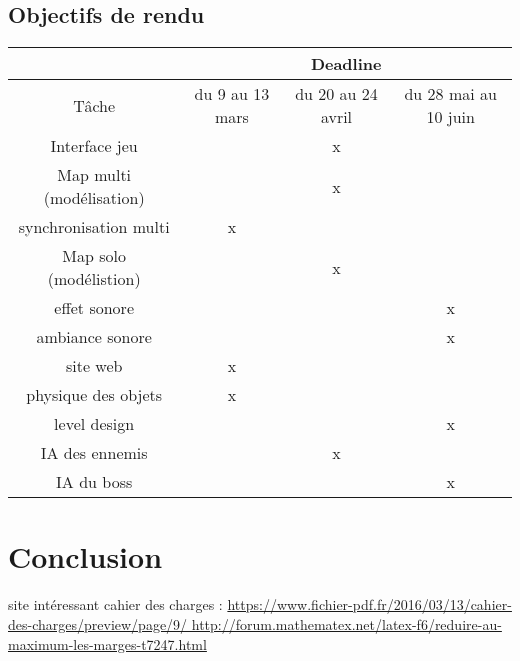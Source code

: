 \documentclass[12pt]{report}
\begin{document}
	\section{Objectifs de rendu}
	
	\begin{tabular}{|*{4}{c|}}
	\hline
	& \multicolumn{3}{|c|}{Deadline}\\
	\hline
	Tâche & du 9 au 13 mars & du 20 au 24 avril & du 28 mai au 10 juin \\
	\hline
	Interface jeu & & x & \\
	\hline
	Map multi (modélisation) & & x & \\
	\hline
	synchronisation multi & x & & \\
	\hline
	Map solo (modélistion) & & x & \\
	\hline
	effet sonore & & & x \\
	\hline
	ambiance sonore & & & x \\
	\hline
	site web & x & & \\
	\hline 
	physique des objets & x & & \\
	\hline 
	level design & & & x \\
	\hline 
	IA des ennemis & & x & \\
	\hline
	IA du boss & & & x \\
	\hline
	
	\end{tabular}
\chapter{Conclusion}
site intéressant cahier des charges : \url{https://www.fichier-pdf.fr/2016/03/13/cahier-des-charges/preview/page/9/

http://forum.mathematex.net/latex-f6/reduire-au-maximum-les-marges-t7247.html}
\end{document}
